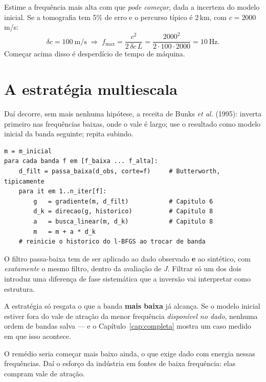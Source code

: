 \documentclass[11pt,a4paper,oneside]{report}
\begin{document}
\begin{pratica}
Estime a frequ\^encia mais alta com que \emph{pode come\c{c}ar}, dada a
incerteza do modelo inicial. Se a tomografia tem 5\% de erro e o percurso
t\'ipico \'e 2\,km, com $c = 2000$\,m/s:
\[
\delta c = 100\ \text{m/s}
\;\Longrightarrow\;
f_{\max} = \frac{c^{2}}{2\,\delta c\,L}
 = \frac{2000^{2}}{2\cdot100\cdot2000} = 10\ \text{Hz}.
\]
Come\c{c}ar acima disso \'e desperd\'icio de tempo de m\'aquina.
\end{pratica}

\section{A estrat\'egia multiescala}

Da\'i decorre, sem mais nenhuma hip\'otese, a receita de Bunks \emph{et al.}
(1995): inverta primeiro nas frequ\^encias baixas, onde o vale \'e largo; use
o resultado como modelo inicial da banda seguinte; repita subindo.

\begin{lstlisting}
m = m_inicial
para cada banda f em [f_baixa ... f_alta]:
    d_filt = passa_baixa(d_obs, corte=f)     # Butterworth, tipicamente
    para it em 1..n_iter[f]:
        g   = gradiente(m, d_filt)           # Capitulo 6
        d_k = direcao(g, historico)          # Capitulo 8
        a   = busca_linear(m, d_k)           # Capitulo 8
        m   = m + a * d_k
    # reinicie o historico do l-BFGS ao trocar de banda
\end{lstlisting}

\begin{atencao}
O filtro passa-baixa tem de ser aplicado ao dado observado \textbf{e} ao
sint\'etico, com \emph{exatamente} o mesmo filtro, dentro da avalia\c{c}\~ao
de $J$. Filtrar s\'o um dos dois introduz uma diferen\c{c}a de fase
sistem\'atica que a invers\~ao vai interpretar como estrutura.
\end{atencao}

\begin{teoria}
A estrat\'egia s\'o resgata o que a banda \textbf{mais baixa} j\'a alcan\c{c}a.
Se o modelo inicial estiver fora do vale de atra\c{c}\~ao da menor
frequ\^encia \emph{dispon\'ivel no dado}, nenhuma ordem de bandas salva --- e
o Cap\'itulo~\ref{cap:completa} mostra um caso medido em que isso acontece.

O rem\'edio seria come\c{c}ar mais baixo ainda, o que exige dado com energia
nessas frequ\^encias. Da\'i o esfor\c{c}o da ind\'ustria em fontes de baixa
frequ\^encia: elas compram vale de atra\c{c}\~ao.
\end{teoria}
\end{document}
